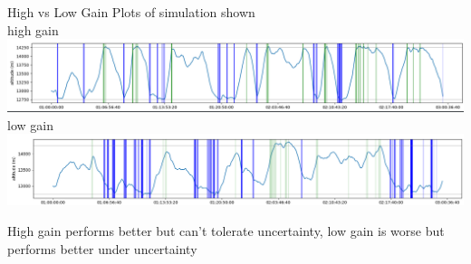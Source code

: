 \documentclass[10pt,mathserif]{beamer}
\begin{document}
\begin{frame}{High vs Low Gain}
Plots of simulation shown\\
high gain
\includegraphics[width=\linewidth,trim={0 5 0 0cm},clip]{highgainsim.png}
\vspace{.05cm}\\
low gain
\includegraphics[width=\linewidth,trim={0 0 0 0cm},clip]{lowgainsim.png}

High gain performs better but can't tolerate uncertainty, low gain is worse but performs better under uncertainty
\end{frame}
\end{document}

